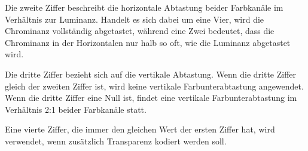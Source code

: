 Die zweite Ziffer beschreibt die horizontale Abtastung beider Farbkanäle im Verhältnis zur Luminanz. Handelt es sich dabei um eine Vier, wird die Chrominanz vollständig abgetastet, während eine Zwei bedeutet, dass die Chrominanz in der Horizontalen nur halb so oft, wie die Luminanz abgetastet wird. 

Die dritte Ziffer bezieht sich auf die vertikale Abtastung. Wenn die dritte Ziffer gleich der zweiten Ziffer ist, wird keine vertikale Farbunterabtastung angewendet. Wenn die dritte Ziffer eine Null ist, findet eine vertikale Farbunterabtastung im Verhältnis 2:1 beider Farbkanäle statt. 

Eine vierte Ziffer, die immer den gleichen Wert der ersten Ziffer hat, wird verwendet, wenn zusätzlich Transparenz kodiert werden soll.

